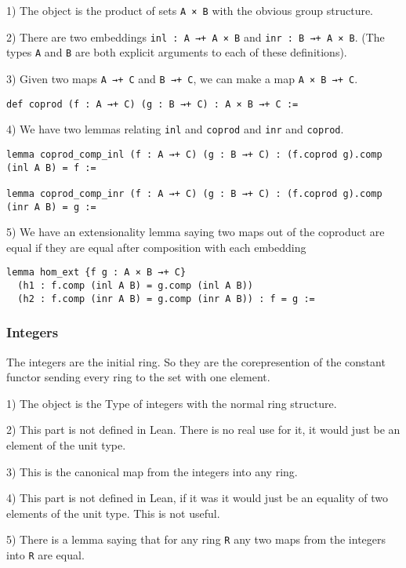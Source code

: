 \documentclass[12pt]{article} %
\theoremstyle{definition}
\theoremstyle{definition}
\theoremstyle{definition}
\theoremstyle{definition}
\begin{document}
1) The object is the product of sets \lstinline{A × B} with the obvious
group structure.

2) There are two embeddings \lstinline{inl : A →+ A × B} and 
\lstinline{inr : B →+ A × B}. (The types \lstinline{A} and \lstinline{B}
are both explicit arguments to each of these definitions).

3) Given two maps \lstinline{A →+ C} and \lstinline{B →+ C}, we can make a map
\lstinline{A × B →+ C}.
\begin{lstlisting}
def coprod (f : A →+ C) (g : B →+ C) : A × B →+ C :=
\end{lstlisting}

4) We have two lemmas relating \lstinline{inl} and \lstinline{coprod} and \lstinline{inr}
and \lstinline{coprod}.
\begin{lstlisting}
lemma coprod_comp_inl (f : A →+ C) (g : B →+ C) : (f.coprod g).comp (inl A B) = f :=

lemma coprod_comp_inr (f : A →+ C) (g : B →+ C) : (f.coprod g).comp (inr A B) = g :=
\end{lstlisting}

5) We have an extensionality lemma saying two maps out of the coproduct are equal 
if they are equal after composition with each embedding
\begin{lstlisting}
lemma hom_ext {f g : A × B →+ C}
  (h1 : f.comp (inl A B) = g.comp (inl A B)) 
  (h2 : f.comp (inr A B) = g.comp (inr A B)) : f = g :=
\end{lstlisting}

\subsubsection{Integers}
The integers are the initial ring. So they are the corepresention of the 
constant functor sending every ring to the set with one element.

1) The object is the Type of integers with the normal ring structure.

2) This part is not defined in Lean. There is no real use for it, it would just be an element of 
the unit type.

3) This is the canonical map from the integers into any ring.

4) This part is not defined in Lean, if it was it would just be an equality of two 
elements of the unit type. This is not useful.

5) There is a lemma saying that for any ring \lstinline{R} any two maps from the integers into \lstinline{R}
are equal.
\end{document}
